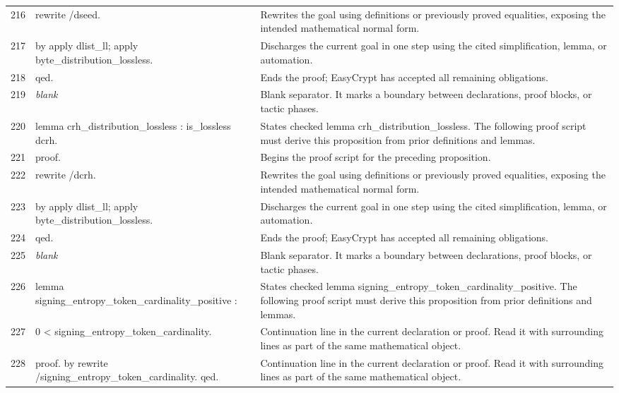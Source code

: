 \documentclass[10pt]{article}
\begin{document}
\begin{longtable}{r L{0.53\textwidth} L{0.37\textwidth}}
216 & {\ttfamily\scriptsize rewrite /dseed.} & Rewrites the goal using definitions or previously proved equalities, exposing the intended mathematical normal form. \\
217 & {\ttfamily\scriptsize by apply dlist\_ll; apply byte\_distribution\_lossless.} & Discharges the current goal in one step using the cited simplification, lemma, or automation. \\
218 & {\ttfamily\scriptsize qed.} & Ends the proof; EasyCrypt has accepted all remaining obligations. \\
219 & {\ttfamily\scriptsize \emph{blank}} & Blank separator.  It marks a boundary between declarations, proof blocks, or tactic phases. \\
220 & {\ttfamily\scriptsize lemma crh\_distribution\_lossless : is\_lossless dcrh.} & States checked lemma crh\_distribution\_lossless.  The following proof script must derive this proposition from prior definitions and lemmas. \\
221 & {\ttfamily\scriptsize proof.} & Begins the proof script for the preceding proposition. \\
222 & {\ttfamily\scriptsize rewrite /dcrh.} & Rewrites the goal using definitions or previously proved equalities, exposing the intended mathematical normal form. \\
223 & {\ttfamily\scriptsize by apply dlist\_ll; apply byte\_distribution\_lossless.} & Discharges the current goal in one step using the cited simplification, lemma, or automation. \\
224 & {\ttfamily\scriptsize qed.} & Ends the proof; EasyCrypt has accepted all remaining obligations. \\
225 & {\ttfamily\scriptsize \emph{blank}} & Blank separator.  It marks a boundary between declarations, proof blocks, or tactic phases. \\
226 & {\ttfamily\scriptsize lemma signing\_entropy\_token\_cardinality\_positive :} & States checked lemma signing\_entropy\_token\_cardinality\_positive.  The following proof script must derive this proposition from prior definitions and lemmas. \\
227 & {\ttfamily\scriptsize   0 < signing\_entropy\_token\_cardinality.} & Continuation line in the current declaration or proof.  Read it with surrounding lines as part of the same mathematical object. \\
228 & {\ttfamily\scriptsize proof. by rewrite /signing\_entropy\_token\_cardinality. qed.} & Continuation line in the current declaration or proof.  Read it with surrounding lines as part of the same mathematical object. \\

\end{longtable}
\end{document}
